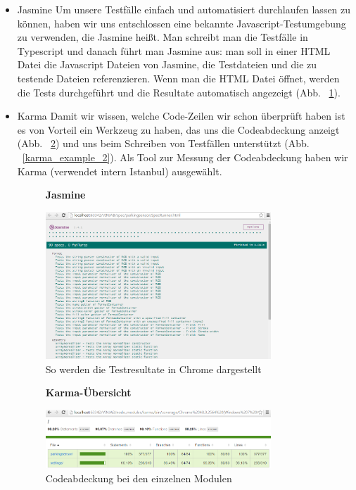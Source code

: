 \documentclass[qualitaetssicherung.tex]{subfiles}
\begin{document}
\begin{itemize}
	
	\item
	Jasmine\newline	
	Um unsere Testfälle einfach und automatisiert durchlaufen lassen zu können, haben wir uns entschlossen eine bekannte Javascript-Testumgebung zu verwenden, die Jasmine heißt. Man schreibt man die Testfälle in Typescript und danach führt man Jasmine aus: man soll in einer HTML Datei die Javascript Dateien von Jasmine, die Testdateien und die zu testende Dateien referenzieren. Wenn man die HTML Datei öffnet, werden die Tests durchgeführt und die Resultate automatisch angezeigt (Abb. ~\ref{jasmine_example}).
	
	\item
	Karma\newline
	Damit wir wissen, welche Code-Zeilen wir schon überprüft haben ist es von Vorteil ein Werkzeug zu haben, das uns die Codeabdeckung anzeigt (Abb. ~\ref{karma_example_1}) und uns beim Schreiben von Testfällen unterstützt (Abb. ~\ref{karma_example_2}). Als Tool zur Messung der Codeabdeckung haben wir Karma (verwendet intern Istanbul) ausgewählt.\newline

	\begin{figure}[H]
		\centering
    \textbf{Jasmine}\par\medskip
    \includegraphics[width=0.8\textwidth]{Images/jasmine-example.png}
    \caption{So werden die Testresultate in Chrome dargestellt}
		\label{jasmine_example}
	\end{figure}
	
	\begin{figure}[H]
		\centering
    \textbf{Karma-Übersicht}\par\medskip
    \includegraphics[width=0.8\textwidth]{Images/karma-example-1.png}
    \caption{Codeabdeckung bei den einzelnen Modulen}
		\label{karma_example_1}
	\end{figure}
	

\end{itemize}
\end{document}
